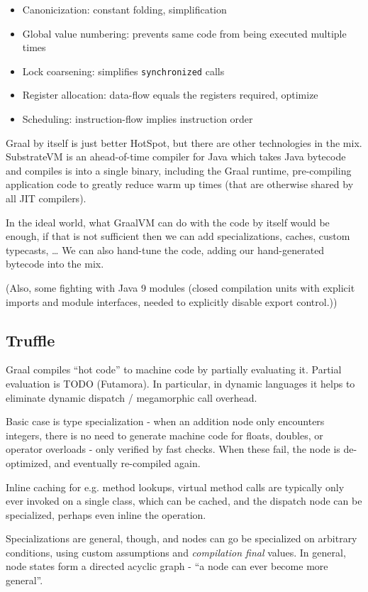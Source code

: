 \documentclass[english,zadani,odsaz]{fitthesis}
\begin{document}
\begin{itemize}
\item Canonicization: constant folding, simplification
\item Global value numbering: prevents same code from being executed multiple times
\item Lock coarsening: simplifies \texttt{synchronized} calls
\item Register allocation: data-flow equals the registers required, optimize
\item Scheduling: instruction-flow implies instruction order
\end{itemize}

Graal by itself is just better HotSpot, but there are other technologies in the
mix. SubstrateVM is an ahead-of-time compiler for Java which takes Java bytecode
and compiles is into a single binary, including the Graal runtime, pre-compiling
application code to greatly reduce warm up times (that are otherwise shared by
all JIT compilers).

In the ideal world, what GraalVM can do with the code by itself would be enough,
if that is not sufficient then we can add specializations, caches, custom
typecasts, \ldots{} We can also hand-tune the code, adding our hand-generated
bytecode into the mix.

(Also, some fighting with Java 9 modules (closed compilation units with explicit
imports and module interfaces, needed to explicitly disable export control.))

\subsection{Truffle}
\label{sec:orgb2ea7c1}
Graal compiles ``hot code'' to machine code by partially evaluating it. Partial
evaluation is TODO (Futamora). In particular, in dynamic languages it helps to
eliminate dynamic dispatch / megamorphic call overhead.

Basic case is type specialization - when an addition node only encounters
integers, there is no need to generate machine code for floats, doubles, or
operator overloads - only verified by fast checks. When these fail, the node is
de-optimized, and eventually re-compiled again.

Inline caching for e.g. method lookups, virtual method calls are typically only
ever invoked on a single class, which can be cached, and the dispatch node can
be specialized, perhaps even inline the operation.

Specializations are general, though, and nodes can go be specialized on
arbitrary conditions, using custom assumptions and \emph{compilation final} values. In
general, node states form a directed acyclic graph - ``a node can ever become more
general''.
\end{document}
